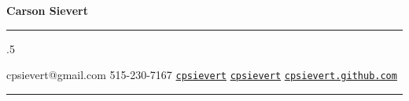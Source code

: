 \centerline{\huge \bf Carson Sievert}

\vspace{2 mm}

\hrule

\vspace{2 mm}


\moveleft.5\hoffset\centerline{
{\Huge \faEnvelope} \hspace{0.5 mm} cpsievert@gmail.com \hspace{1 mm} {\Huge \faPhone}  \hspace{0.5 mm} 515-230-7167  \hspace{1 mm} {\Huge \faGithub}  \hspace{0.5 mm} \href{http://github.com/cpsievert}{\tt cpsievert} \hspace{1 mm} {\Huge \faTwitter} \hspace{0.5 mm} \href{http://twitter.com/cpsievert}{\tt cpsievert} \hspace{1 mm} {\Huge \faGlobe}  \hspace{0.5 mm} \href{http://cpsievert.github.com}{\tt cpsievert.github.com}
}
\vspace{2 mm}

\hrule